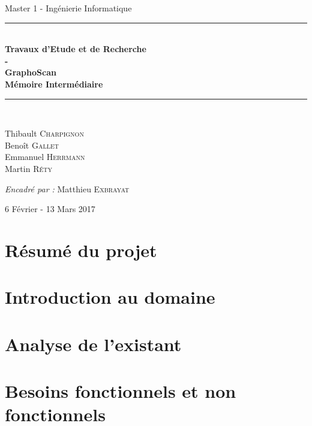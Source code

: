 \documentclass{article}
\begin{document}
\begin{center}
{\large Master 1 - Ingénierie Informatique} \\ [0.5cm]
\vfill
\rule{\linewidth}{0.4mm} \\ [0.4cm]
{\huge \bfseries
Travaux d'Etude et de Recherche\\
- \\
GraphoScan \\ [0.4cm]
Mémoire Intermédiaire \\ [0.4cm]
}
\rule{\linewidth}{0.4mm} \\ [1.5cm]

\begin{minipage}{0.4\textwidth}
\begin{flushleft} \large
Thibault \textsc{Charpignon} \\
Benoît \textsc{Gallet} \\
Emmanuel \textsc{Herrmann} \\
Martin \textsc{Réty}
\end{flushleft}
\end{minipage}

\vfill

\large\emph{Encadré par : }{Matthieu \textsc{Exbrayat}}

\vfill


{\large 6 Février - 13 Mars 2017}

\end{center}

\newpage
 
\tableofcontents

\newpage
 
\section{Résumé du projet}



\section{Introduction au domaine}



\section{Analyse de l'existant}



\section{Besoins fonctionnels et non fonctionnels}
\end{document}
